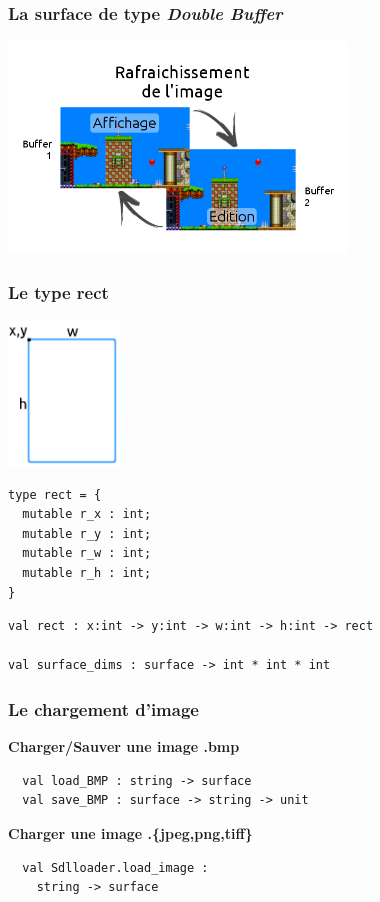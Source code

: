 \begin{frame}
	\frametitle{La surface de type \textit{Double Buffer}}
	\begin{center}
		\includegraphics[width=9cm]{pics/doubleBuffer.png}
	\end{center}
\end{frame}

\begin{frame}[fragile]
	\frametitle{Le type rect}
	\begin{center}\begin{minipage}{0.4\textwidth}
		\includegraphics[width=3cm]{pics/rect.png}
	\end{minipage}
	\begin{minipage}{0.4\textwidth}
		\lstset{basicstyle=\footnotesize}
		\begin{lstlisting}
type rect = {
  mutable r_x : int;
  mutable r_y : int;
  mutable r_w : int;
  mutable r_h : int;
} 
		\end{lstlisting}
	\end{minipage}\end{center}
	\lstset{basicstyle=\footnotesize}
	\begin{lstlisting}
val rect : x:int -> y:int -> w:int -> h:int -> rect

val surface_dims : surface -> int * int * int
	\end{lstlisting}
\end{frame}

\begin{frame}[fragile]
	\frametitle{Le chargement d'image}
	\textbf{Charger/Sauver une image .bmp}
	\begin{lstlisting}
  val load_BMP : string -> surface
  val save_BMP : surface -> string -> unit
	\end{lstlisting}
	\textbf{Charger une image .\{jpeg,png,tiff\}}
	\begin{lstlisting}
  val Sdlloader.load_image : 
    string -> surface

	\end{lstlisting}
\end{frame}

